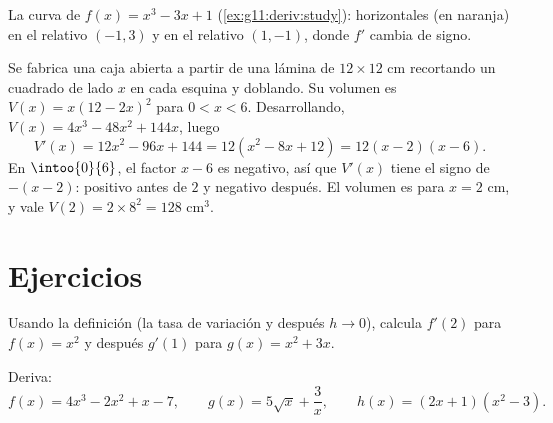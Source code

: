\begin{omfigure}

{\small La curva de $f(x) = x^3 - 3x + 1$ (\cref{ex:g11:deriv:study}):
 horizontales (en naranja) en el  relativo $(-1, 3)$ y en
el  relativo $(1, -1)$, donde $f'$ cambia de signo.}
\end{omfigure}

\begin{example}[Optimización]\label{ex:g11:deriv:box}
Se fabrica una caja abierta a partir de una lámina de $12 \times 12$ cm
recortando un cuadrado de lado $x$ en cada esquina y doblando. Su volumen
es $V(x) = x(12 - 2x)^2$ para $0 < x < 6$. Desarrollando,
$V(x) = 4x^3 - 48x^2 + 144x$, luego
\[
V'(x) = 12x^2 - 96x + 144 = 12(x^2 - 8x + 12) = 12(x - 2)(x - 6).
\]
En $\intoo{0}{6}$, el factor $x - 6$ es negativo, así que $V'(x)$ tiene el
signo de $-(x-2)$: positivo antes de $2$ y negativo después. El volumen es
 para $x = 2$ cm, y vale $V(2) = 2 \times 8^2 = 128$ cm$^3$.
\end{example}

\section{Ejercicios}

\begin{exercise}[$\star$]\label{exo:g11:deriv:1}
Usando la definición (la tasa de variación y después $h \to 0$), calcula
$f'(2)$ para $f(x) = x^2$ y después $g'(1)$ para $g(x) = x^2 + 3x$.
\end{exercise}

\begin{exercise}[$\star$]\label{exo:g11:deriv:2}
Deriva:
\[
f(x) = 4x^3 - 2x^2 + x - 7, \qquad
g(x) = 5\sqrt{x} + \frac{3}{x}, \qquad
h(x) = (2x+1)(x^2 - 3) .
\]
\end{exercise}

